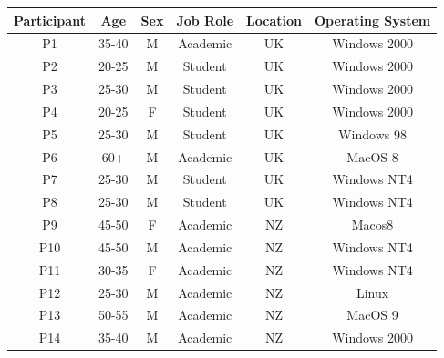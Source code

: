 \begin{table}[hbt]
\begin{center}
\begin{footnotesize}
\setlength{\extrarowheight}{2pt}
\begin{tabular}{|c|c|c|c|c|c|}
\hline
    {\bf Participant} &  {\bf Age} &  {\bf Sex} & {\bf Job Role} & {\bf Location} & {\bf Operating System} \\
\hline
         P1 &      35-40 &          M &   Academic &         UK & Windows 2000 \\
\hline
         P2 &      20-25 &          M &    Student &         UK & Windows 2000 \\
\hline
         P3 &      25-30 &          M &    Student &         UK & Windows 2000 \\
\hline
         P4 &      20-25 &          F &    Student &         UK & Windows 2000 \\
\hline
         P5 &      25-30 &          M &    Student &         UK & Windows 98 \\
\hline
         P6 &        60+ &          M &   Academic &         UK &    MacOS 8 \\
\hline
         P7 &      25-30 &          M &    Student &         UK & Windows NT4 \\
\hline
         P8 &      25-30 &          M &    Student &         UK & Windows NT4 \\
\hline
         P9 &      45-50 &          F &   Academic &         NZ &     Macos8 \\
\hline
        P10 &      45-50 &          M &   Academic &         NZ & Windows NT4 \\
\hline
        P11 &      30-35 &          F &   Academic &         NZ & Windows NT4 \\
\hline
        P12 &      25-30 &          M &   Academic &         NZ &      Linux \\
\hline
        P13 &      50-55 &          M &   Academic &         NZ &    MacOS 9 \\
\hline
        P14 &      35-40 &          M &   Academic &         NZ & Windows 2000 \\

\end{tabular}
\end{footnotesize}
\end{center}
\end{table}
